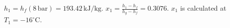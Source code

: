 \( h_1 = h_f(8 \, \text{bar}) = 193.42 \, \text{kJ/kg} \).  
\( x_1 = \frac{h_1 - h_f}{h_g - h_f} = 0.3076 \).  
\( x_1 \) is calculated at \( T_1 = -16^\circ \text{C} \).